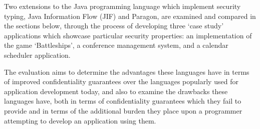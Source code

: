 Two extensions to the Java programming language which implement security typing, Java Information Flow (JIF) and Paragon, are examined and compared in the sections below, through the process of developing three `case study' applications which showcase particular security properties: an implementation of the game `Battleships', a conference management system, and a calendar scheduler application.

The evaluation aims to determine the advantages these languages have in terms of improved confidentiality guarantees over the languages popularly used for application development today, and also to examine the drawbacks these languages have, both in terms of confidentiality guarantees which they fail to provide and in terms of the additional burden they place upon a programmer attempting to develop an application using them.